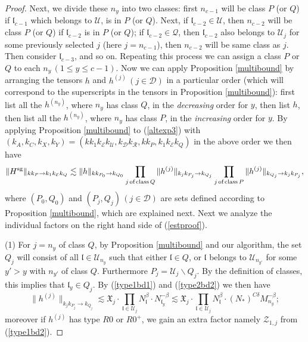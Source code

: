 \documentclass[11 pt,reqno]{amsart}
\theoremstyle{definition}
\theoremstyle{remark}
\numberwithin{equation}{section}
\newcommand{\Dc}{\mathcal{D}}
\newcommand{\Ec}{\mathcal{E}}
\newcommand{\Qc}{\mathcal{Q}}
\newcommand{\Rc}{\mathcal{R}}
\newcommand{\Uc}{\mathcal{U}}
\newcommand{\Zc}{\mathcal{Z}}
\newcommand{\Xf}{\mathfrak{X}}
\newcommand{\lf}{\mathfrak{l}}
\begin{document}
{\begin{proof}
  Next, we divide these $n_y$ into two classes: first $n_{c-1}$ will be class $P$ (or $Q$) if $\lf_{c-1}$ which belongs to $\Uc$, is in $P$ (or $Q$). Next, if $\lf_{c-2}\in \Uc$, then $n_{c-2}$ will be class $P$ (or $Q$) if $\lf_{c-2}$ is in $P$ (or $Q$); if $\lf_{c-2}\in\Qc$, then $\lf_{c-2}$ also belongs to $\Uc_j$ for some previously selected $j$ (here $j=n_{c-1}$), then $n_{c-2}$ will be same class as $j$. Then consider $\lf_{c-3}$, and so on. Repeating this process we can assign a class $P$ or $Q$ to each $n_y\,(1\leq y\leq c-1)$. Now we can apply Proposition \ref{multibound} by arranging the tensors $h$ and $h^{(j)}\,(j\in \Dc)$ in a particular order (which will correspond to the superscripts in the tensors in Proposition \ref{multibound}): first list all the $h^{(n_y)}$, where $n_y$ has class $Q$, in the \emph{decreasing} order for $y$, then list $h$, then list all the $h^{(n_y)}$, where $n_y$ has class $P$, in the \emph{increasing} order for $y$. By applying Proposition \ref{multibound} to (\ref{altexp3}) with $(k_A, k_C, k_X, k_Y) = (kk_1k_\Ec k_\Uc, k_\Dc k_\Rc, kk_P, k_1 k_\Ec k_Q)$ in the above order we then have
\begin{equation}  \label{estproof}
  \|H^{\mathrm{sg}}\|_{kk_P\to k_1k_\Ec k_Q}\lesssim\|h\|_{kk_{P_0}\to k_{Q_0}}\prod_{j\text{\,of\,class\,}Q}\|h^{(j)}\|_{k_jk_{P_j}\to k_{Q_j}} \prod_{j\text{\,of\,class\,}P}\|h^{(j)}\|_{k_{Q_j}\to k_j k_{P_j}},
  \end{equation} where $(P_0,Q_0)$ and $(P_j,Q_j)\,(j\in\Dc)$ are sets defined according to Proposition \ref{multibound}, which are explained next. Next we analyze the individual factors on the right hand side of (\ref{estproof}).
  
  (1) For $j=n_y$ of class $Q$, by Proposition \ref{multibound} and our algorithm, the set $Q_j$ will consist of all $\lf\in \Uc_{n_y}$ such that either $\lf\in Q$, or $\lf$ belongs to $\Uc_{n_{y'}}$ for some $y'>y$ with $n_{y'}$ of class $Q$. Furthermore $P_j = \Uc_j\backslash Q_j$. By the definition of classes, this implies that $\lf_{y}\in Q_j$.  By (\ref{type1bd1}) and (\ref{type2bd2}) we then have
  \begin{equation}\label{actbd1}\|h^{(j)}\|_{k_jk_{P_j}\to k_{Q_j}}\lesssim \Xf_j\cdot\prod_{\lf\in\Uc_j} N_\lf^\beta\cdot N_{\lf_y}^{-\beta}\lesssim \Xf_j\cdot\prod_{\lf\in\Uc_j} N_\lf^\beta\cdot
  (N_*)^{C\delta}M_{n_y}^{-\beta};
  \end{equation} moreover if $h^{(j)}$ has type $R0$ or $R0^+$, we gain an extra factor namely $\Zc_{1,j}$ from (\ref{type1bd2}).
  

\end{proof}}
\end{document}
